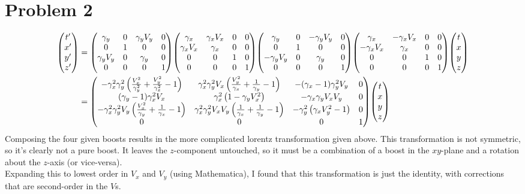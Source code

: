 \documentclass[12pt]{article}
\begin{document}
\section*{Problem 2}
\begin{align*}
    \mqty(t' \\ x' \\ y' \\ z') &= 
        \mqty(
            \gamma_y & 0 & \gamma_y V_y & 0 \\
            0 & 1 & 0 & 0 \\
            \gamma_y V_y & 0 & \gamma_y & 0 \\
            0 & 0 & 0 & 1
        )
        \mqty(
            \gamma_x & \gamma_x V_x & 0 & 0 \\
            \gamma_x V_x & \gamma_x & 0 & 0 \\
            0 & 0 & 1 & 0 \\
            0 & 0 & 0 & 1
        )
        \mqty(
            \gamma_y & 0 & -\gamma_y V_y & 0 \\
            0 & 1 & 0 & 0 \\
            -\gamma_y V_y & 0 & \gamma_y & 0 \\
            0 & 0 & 0 & 1
        )
        \mqty(
            \gamma_x & -\gamma_x V_x & 0 & 0 \\
            -\gamma_x V_x & \gamma_x & 0 & 0 \\
            0 & 0 & 1 & 0 \\
            0 & 0 & 0 & 1
        )
        \mqty(t \\ x \\ y \\ z) \\
    &= \mqty(
        -\gamma_x^2\gamma_y^2 \left(\frac{V_x^2}{\gamma_y^2} + \frac{V_y^2}{\gamma_x^2} - 1 \right) & \gamma_x^2\gamma_y^2V_x\left(\frac{V_y^2}{\gamma_x} + \frac{1}{\gamma_y} - 1\right) & -(\gamma_x - 1)\gamma_y^2V_y & 0 \\
        (\gamma_y - 1)\gamma_x^2V_x & \gamma_x^2\left(1 - \gamma_yV_x^2\right) & -\gamma_x\gamma_yV_xV_y & 0 \\
        -\gamma_x^2\gamma_y^2V_y\left(\frac{V_x^2}{\gamma_y} + \frac{1}{\gamma_x} - 1\right) & \gamma_x^2\gamma_y^2V_xV_y\left(\frac{1}{\gamma_x} + \frac{1}{\gamma_y} - 1\right) & -\gamma_y^2\left(\gamma_xV_y^2 - 1\right) & 0 \\
        0 & 0 & 0 & 1
        )
        \mqty(t \\ x \\ y \\ z)
\end{align*}
Composing the four given boosts results in the more complicated lorentz transformation given above. This transformation is not symmetric, so it's clearly not a pure boost. It leaves the $z$-component untouched, so it must be a combination of a boost in the $xy$-plane and a rotation about the $z$-axis (or vice-versa). \\
Expanding this to lowest order in $V_x$ and $V_y$ (using Mathematica), I found that this transformation is just the identity, with corrections that are second-order in the $V$s.
\end{document}
